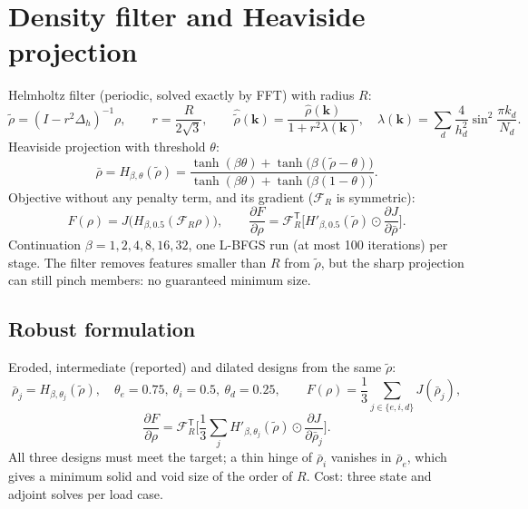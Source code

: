 \documentclass[11pt]{article}
\newcommand{\bs}[1]{\boldsymbol{#1}}
\begin{document}
\section*{Density filter and Heaviside projection}
Helmholtz filter (periodic, solved exactly by FFT) with radius $R$:
\begin{equation}
  \tilde\rho = (I - r^2\Delta_h)^{-1}\rho, \qquad r = \frac{R}{2\sqrt{3}},
  \qquad
  \hat{\tilde\rho}(\bs{k}) = \frac{\hat\rho(\bs{k})}{1 + r^2\lambda(\bs{k})},
  \quad \lambda(\bs{k}) = \sum_d \frac{4}{h_d^2}\sin^2\!\frac{\pi k_d}{N_d}.
\end{equation}
Heaviside projection with threshold $\theta$:
\begin{equation}
  \bar\rho = H_{\beta,\theta}(\tilde\rho)
  = \frac{\tanh(\beta\theta) + \tanh\big(\beta(\tilde\rho-\theta)\big)}{\tanh(\beta\theta) + \tanh\big(\beta(1-\theta)\big)} .
\end{equation}
Objective without any penalty term, and its gradient ($\mathcal{F}_R$ is symmetric):
\begin{equation}
  F(\rho) = J\big(H_{\beta,0.5}(\mathcal{F}_R\rho)\big),
  \qquad
  \frac{\partial F}{\partial\rho} = \mathcal{F}_R^{\mathsf T}\Big[H'_{\beta,0.5}(\tilde\rho)\odot\frac{\partial J}{\partial\bar\rho}\Big].
\end{equation}
Continuation $\beta = 1,2,4,8,16,32$, one L-BFGS run (at most 100 iterations) per stage.
The filter removes features smaller than $R$ from $\tilde\rho$, but the sharp projection can still
pinch members: no guaranteed minimum size.

\subsection*{Robust formulation}
Eroded, intermediate (reported) and dilated designs from the same $\tilde\rho$:
\begin{equation}
  \bar\rho_j = H_{\beta,\theta_j}(\tilde\rho),\quad \theta_e = 0.75,\ \theta_i = 0.5,\ \theta_d = 0.25,
  \qquad
  F(\rho) = \frac13\sum_{j\in\{e,i,d\}} J(\bar\rho_j),
\end{equation}
\begin{equation}
  \frac{\partial F}{\partial\rho} = \mathcal{F}_R^{\mathsf T}\Big[\frac13\sum_j H'_{\beta,\theta_j}(\tilde\rho)\odot\frac{\partial J}{\partial\bar\rho_j}\Big].
\end{equation}
All three designs must meet the target; a thin hinge of $\bar\rho_i$ vanishes in $\bar\rho_e$, which gives a
minimum solid and void size of the order of $R$. Cost: three state and adjoint solves per load case.
\end{document}

